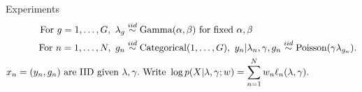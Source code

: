 
\begin{frame}{Experiments}
    \begin{align*}
    \textrm{For }g=1,\ldots,G,\textrm{ }
        \lambda_g \overset{iid}{\sim}{}& \mathrm{Gamma}(\alpha, \beta) \textrm{ for fixed }\alpha,\beta\\
    \textrm{For }n = 1,\ldots,N,\textrm{ }
        g_n \overset{iid}{\sim}{}& \mathrm{Categorical}(1,\ldots,G),\textrm{ }
        y_n | \lambda_n, \gamma, g_n \overset{iid}{\sim}{}
            \mathrm{Poisson}(\gamma \lambda_{g_n}).\\
    x_n ={} (y_n, g_n)
    \textrm{ are IID given } \lambda, \gamma. &
    \textrm{   Write }\log p(X \vert \lambda, \gamma; w) =
       \sum_{n=1}^N w_n \ell_n(\lambda, \gamma).
    \end{align*}
    
    \pause
    
    \HighDimAccuracyGraph{}
    
\end{frame}
        
    



